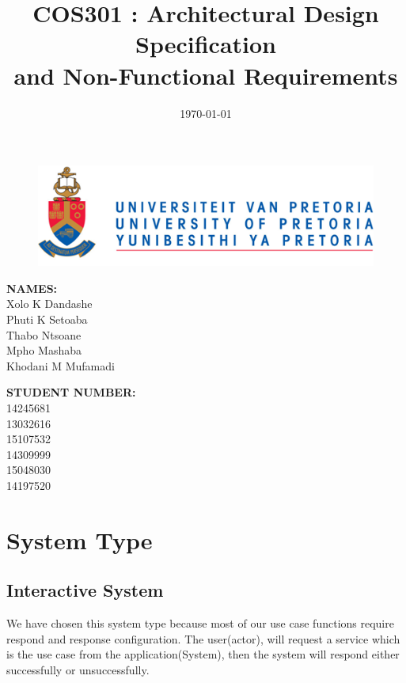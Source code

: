 \documentclass[english]{article}
\title{COS301 : Architectural Design Specification \\and Non-Functional Requirements}
\date{\today}
\begin{document}
	\maketitle
	\begin{figure}[!t]
		\includegraphics{up_logo.png}
	\end{figure}
	\begin{minipage}{0.4\textwidth}
		\begin{flushleft} \large
			\textbf{NAMES:}\\[0.4cm]
			Xolo K Dandashe\\
			Phuti K Setoaba\\
			Thabo Ntsoane\\
			Mpho Mashaba\\	
			Khodani M Mufamadi

		\end{flushleft}
	\end{minipage}
	\begin{minipage}{0.4\textwidth}
		\begin{flushright} \large
			\textbf{STUDENT NUMBER:} \\[0.4cm]
		 	14245681\\ 	
		 	13032616\\		
		 	15107532\\	
		 	14309999\\		
		 	15048030\\	
		 	14197520
		\end{flushright}
	\end{minipage}


	
	\newpage

	\tableofcontents
	
	\newpage
	\section{System Type} 
	\subsection{Interactive System}
		We have chosen this system type because most of our use case functions require respond and response configuration. The user(actor), will request a service which is the use case from the application(System), then the system will respond either successfully or unsuccessfully.
		
\end{document}
